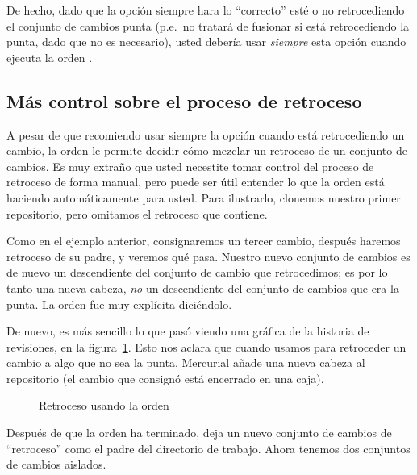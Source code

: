 De hecho, dado que la opción  siempre hara lo
``correcto'' esté o no retrocediendo el conjunto de cambios punta
(p.e.~no tratará de fusionar si está retrocediendo la punta, dado que
no es necesario), usted debería usar \emph{siempre} esta opción cuando
ejecuta la orden .

\subsection{Más control sobre el proceso de retroceso}

A pesar de que recomiendo usar siempre la opción 
 cuando está retrocediendo un cambio, la orden
 le permite decidir cómo mezclar un retroceso de un
conjunto de cambios.  Es muy extraño que usted necestite tomar control
del proceso de retroceso de forma manual, pero puede ser útil entender
lo que la orden  está haciendo automáticamente para
usted. Para ilustrarlo, clonemos nuestro primer repositorio, pero
omitamos el retroceso que contiene.

Como en el ejemplo anterior, consignaremos un tercer cambio, después
haremos retroceso de su padre, y veremos qué pasa.
Nuestro nuevo conjunto de cambios es de nuevo un descendiente del
conjunto de cambio que retrocedimos; es por lo tanto una nueva cabeza,
\emph{no} un descendiente del conjunto de cambios que era la punta. La
orden  fue muy explícita diciéndolo.

De nuevo, es más sencillo lo que pasó viendo una gráfica de la
historia de revisiones, en la figura~\ref{fig:undo:backout-manual}.
Esto nos aclara que cuando usamos  para retroceder un
cambio a algo que no sea la punta, Mercurial añade una nueva cabeza al
repositorio (el cambio que consignó está encerrado en una caja).

\begin{figure}[htb]
  \centering
  \caption{Retroceso usando la orden }
  \label{fig:undo:backout-manual}
\end{figure}

Después de que la orden  ha terminado, deja un nuevo
conjunto de cambios de ``retroceso'' como el padre del directorio de trabajo.
Ahora tenemos dos conjuntos de cambios aislados.


